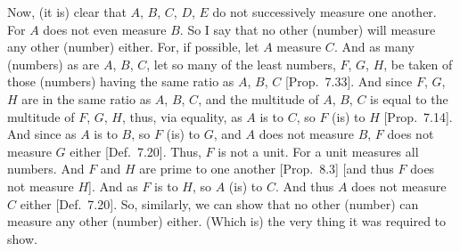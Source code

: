 \begin{Parallel}{}{}
{ \epsfysize=2in
\centerline{}

 
 Now, (it is) clear that $A$, $B$, $C$, $D$, $E$ do not successively measure
 one another. For $A$ does not even measure $B$. So I say that  
 no other (number) will measure any other (number) either. For, if possible, let $A$ measure
 $C$. And as many (numbers) as  are $A$, $B$, $C$, let  so many of the least numbers,
 $F$, $G$, $H$, be taken of those (numbers) having the same ratio as $A$, $B$, $C$ [Prop.~7.33]. And since $F$, $G$, $H$ are in the same ratio as $A$, $B$, $C$, and the multitude of
 $A$, $B$, $C$ is equal to the multitude of $F$, $G$, $H$, thus, via
 equality, as $A$ is to $C$, so $F$ (is) to $H$ [Prop.~7.14]. And since as $A$ is to $B$, so $F$ (is) to $G$, and $A$ does not measure $B$, $F$ does not measure $G$ either
 [Def.~7.20]. Thus, $F$ is not a unit. For a unit measures all numbers. And $F$ and $H$ are prime to one another [Prop.~8.3] [and thus $F$ does not measure $H$].
 And as $F$ is to $H$, so $A$ (is) to $C$. And thus $A$ does not measure
 $C$ either [Def.~7.20]. So, similarly, we can show
 that no other (number) can measure any other (number) either.
 (Which is) the very thing it was required to show.}
\end{Parallel}

